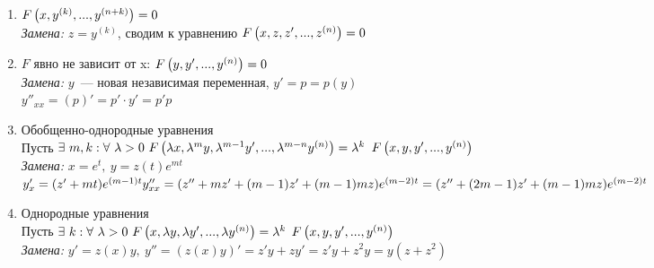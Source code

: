 \begin{enumerate}
    \item $F \left({x, y^{(k)}, ..., y^{(n+k)}}\right) = 0$\\
    \textit{Замена:} $z = y^{(k)}$, сводим к уравнению
    $F \left({x, z, z', ..., z^{(n)}}\right) = 0$
    \item $F$ явно не зависит от x: $F \left({y, y', ..., y^{(n)}}\right) = 0$\\
    \textit{Замена:} $y$~--- новая независимая переменная, $y' = p = p(y)$ \\
    $y''_{xx} = (p)' = p' \cdot y' = p'p$
    \item Обобщенно-однородные уравнения
    \\
    Пусть $\exists \ m, k: \forall \ \lambda > 0 \ F \left({\lambda x, \lambda^{m}y, \lambda^{m-1} y', ..., \lambda^{m-n}y^{(n)}}\right) = \lambda^k $ $F \left({x, y, y', ..., y^{(n)}}\right)$\\
     \textit{Замена:} $x = e^t, \ y = z(t)e^{mt}$ \\ $y'_{x} = (z' + mt)e^{(m-1)t} \\ y''_{xx} = (z'' + mz' + (m-1)z' + (m-1)mz)e^{(m-2)t} = (z'' + (2m - 1)z' + (m-1)mz)e^{(m-2)t}$
    \item Однородные уравнения \\
       Пусть $\exists \  k: \forall \ \lambda > 0 \ F \left({x, \lambda y, \lambda  y', ..., \lambda y^{(n)}}\right) = \lambda^k $ $F \left({x, y, y', ..., y^{(n)}}\right)$\\
        \textit{Замена:} $y' = z(x)y, \ y'' = (z(x)y)' = z'y + zy' = z'y + z^2y = y(z+z^2)$
\end{enumerate}